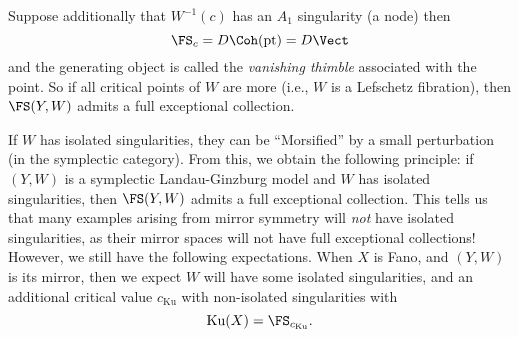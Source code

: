 

Suppose additionally that $W^{-1}(c)$ has an $A_1$ singularity (a node) then 
\[\FS_c = D\Coh(\text{pt}) = D\Vect\]
and the generating object is called the \emph{vanishing thimble} associated with the point. So if all critical points of $W$ are more (i.e., $W$ is a Lefschetz fibration), then $\FS(Y, W)$ admits a full exceptional collection. 

If $W$ has isolated singularities, they can be ``Morsified'' by a small perturbation (in the symplectic category). From this, we obtain the following principle:
if $(Y, W)$ is a symplectic Landau-Ginzburg model and $W$ has isolated singularities, then $\FS(Y, W)$ admits a full exceptional collection. 
This tells us that many examples arising from mirror symmetry will \emph{not} have isolated singularities, as their mirror spaces will not have full exceptional collections! However, we still have the following expectations. When $X$ is Fano, and $(Y, W)$ is its mirror, then we expect $W$ will have some isolated singularities, and an additional critical value $c_{\text{Ku}}$ with non-isolated singularities with 
\[\text{Ku}(X) = \FS_{c_{\text{Ku}}}.\]

